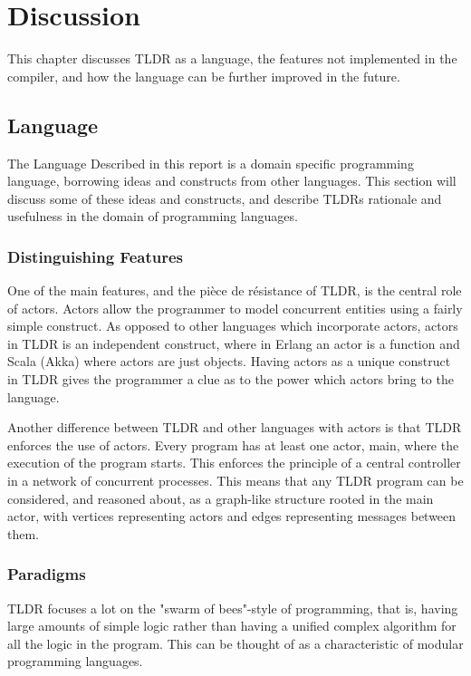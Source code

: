 \chapter{Discussion}

This chapter discusses TLDR as a language, the features not implemented in the compiler, and how the language can be further improved in the future.

\section{Language}
The Language Described in this report is a domain specific programming language, borrowing ideas and constructs from other languages. This section will discuss some of these ideas and constructs, and describe TLDRs rationale and usefulness in the domain of programming languages.

\subsection{Distinguishing Features}
One of the main features, and the pièce de résistance of TLDR, is the central role of actors. Actors allow the programmer to model concurrent entities using a fairly simple construct. As opposed to other languages which incorporate actors, actors in TLDR is an independent construct, where in Erlang an actor is a function and Scala (Akka) where actors are just objects. Having actors as a unique construct in TLDR gives the programmer a clue as to the power which actors bring to the language. 

Another difference between TLDR and other languages with actors is that TLDR enforces the use of actors. Every program has at least one actor, main, where the execution of the program starts. This enforces the principle of a central controller in a network of concurrent processes. This means that any TLDR program can be considered, and reasoned about, as a graph-like structure rooted in the main actor, with vertices representing actors and edges representing messages between them.


\subsection{Paradigms}
TLDR focuses a lot on the "swarm of bees"-style of programming, that is, having large amounts of simple logic rather than having a unified complex algorithm for all the logic in the program. This can be thought of as a characteristic of modular programming languages.


